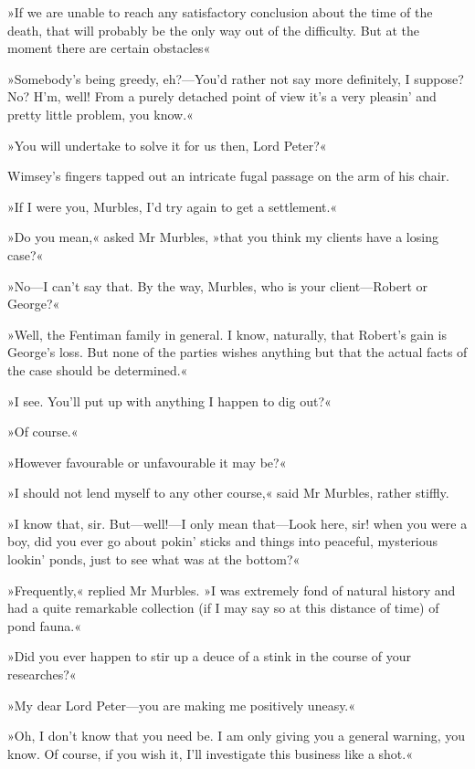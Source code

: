 »If we are unable to reach any satisfactory conclusion about the time of the death, that will probably be the only way out of the difficulty. But at the moment there are certain obstacles\longdash«

»Somebody's being greedy, eh?---You'd rather not say more definitely, I suppose? No? H'm, well! From a purely detached point of view it's a very pleasin' and pretty little problem, you know.«

»You will undertake to solve it for us then, Lord Peter?«

Wimsey's fingers tapped out an intricate fugal passage on the arm of his chair.

»If I were you, Murbles, I'd try again to get a settlement.«

»Do you mean,« asked Mr Murbles, »that you think my clients have a losing case?«

»No\allowbreak---\allowbreak I can't say that. By the way, Murbles, who is your client\allowbreak---\allowbreak Robert or George?«

»Well, the Fentiman family in general. I know, naturally, that Robert's gain is George's loss. But none of the parties wishes anything but that the actual facts of the case should be determined.«

»I see. You'll put up with anything I happen to dig out?«

»Of course.«

»However favourable or unfavourable it may be?«

»I should not lend myself to any other course,« said Mr Murbles, rather stiffly.

»I know that, sir. But\allowbreak---\allowbreak well!---I only mean that\allowbreak---\allowbreak Look here, sir! when you were a boy, did you ever go about pokin' sticks and things into peaceful, mysterious lookin' ponds, just to see what was at the bottom?«

»Frequently,« replied Mr Murbles. »I was extremely fond of natural history and had a quite remarkable collection (if I may say so at this distance of time) of pond fauna.«

»Did you ever happen to stir up a deuce of a stink in the course of your researches?«

»My dear Lord Peter\allowbreak---\allowbreak you are making me positively uneasy.«

»Oh, I don't know that you need be. I am only giving you a general warning, you know. Of course, if you wish it, I'll investigate this business like a shot.«

